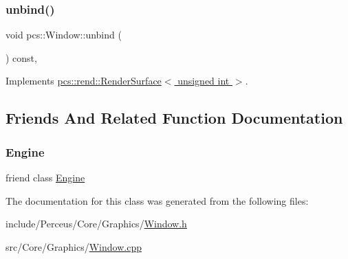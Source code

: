 \subsubsection{\texorpdfstring{unbind()}{unbind()}}
{\footnotesize\ttfamily void pcs\+::\+Window\+::unbind (\begin{DoxyParamCaption}{ }\end{DoxyParamCaption}) const\hspace{0.3cm}{\ttfamily [override]}, {\ttfamily [virtual]}}



Implements \hyperlink{classpcs_1_1rend_1_1RenderSurface_aacb7218feb1973ee4b0486494fcd8c88}{pcs\+::rend\+::\+Render\+Surface$<$ unsigned int $>$}.



\subsection{Friends And Related Function Documentation}
\mbox{\label{classpcs_1_1Window_a3e1914489e4bed4f9f23cdeab34a43dc}} 
\subsubsection{\texorpdfstring{Engine}{Engine}}
{\footnotesize\ttfamily friend class \hyperlink{classpcs_1_1Engine}{Engine}\hspace{0.3cm}{\ttfamily [friend]}}



The documentation for this class was generated from the following files\+:\begin{DoxyCompactItemize}
\item 
include/\+Perceus/\+Core/\+Graphics/\hyperlink{Window_8h}{Window.\+h}\item 
src/\+Core/\+Graphics/\hyperlink{Window_8cpp}{Window.\+cpp}\end{DoxyCompactItemize}
